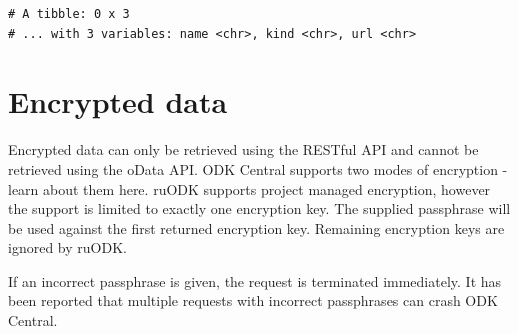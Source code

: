 \documentclass[
  letterpaper,
  DIV=11,
  numbers=noendperiod,
  oneside]{scrreprt}
\begin{document}
\begin{verbatim}
# A tibble: 0 x 3
# ... with 3 variables: name <chr>, kind <chr>, url <chr>
\end{verbatim}

\hypertarget{encrypted-data}{%
\section{Encrypted data}\label{encrypted-data}}

Encrypted data can only be retrieved using the RESTful API and cannot be
retrieved using the oData API. ODK Central supports two modes of
encryption - learn about them here. ruODK supports project managed
encryption, however the support is limited to exactly one encryption
key. The supplied passphrase will be used against the first returned
encryption key. Remaining encryption keys are ignored by ruODK.

\begin{tcolorbox}[enhanced jigsaw, colbacktitle=quarto-callout-important-color!10!white, titlerule=0mm, breakable, opacityback=0, opacitybacktitle=0.6, left=2mm, coltitle=black, colback=white, title=\textcolor{quarto-callout-important-color}{\faExclamation}\hspace{0.5em}{Important}, rightrule=.15mm, colframe=quarto-callout-important-color-frame, toprule=.15mm, bottomtitle=1mm, toptitle=1mm, arc=.35mm, bottomrule=.15mm, leftrule=.75mm]
If an incorrect passphrase is given, the request is terminated
immediately. It has been reported that multiple requests with incorrect
passphrases can crash ODK Central.
\end{tcolorbox}
\end{document}
